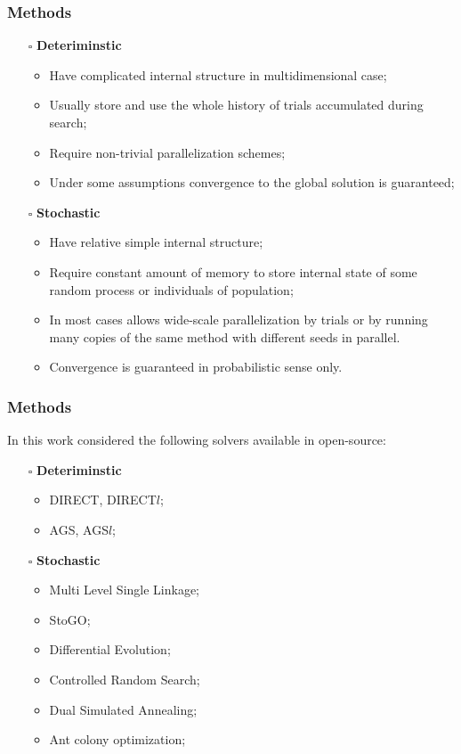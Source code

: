 \documentclass[aspectratio=1610]{beamer}
\begin{document}
\begin{frame}
  \frametitle{Methods}
  \begin{itemize}
    \item[$\square$] \textbf{Deteriminstic}
    \begin{itemize}
      \item Have complicated internal structure in multidimensional case;
      \item Usually store and use the whole history of trials accumulated during search;
      \item Require non-trivial parallelization schemes;
      \item Under some assumptions convergence to the global solution is guaranteed;
    \end{itemize}
    \item[$\square$] \textbf{Stochastic}
    \begin{itemize}
      \item Have relative simple internal structure;
      \item Require constant amount of memory to store internal state of some random process or individuals of population;
      \item In most cases allows wide-scale parallelization by trials or by running many copies of the same method
      with different seeds in parallel.
      \item Convergence is guaranteed in probabilistic sense only.
    \end{itemize}
  \end{itemize}
\end{frame}

\begin{frame}
  \frametitle{Methods}
  In this work considered the following solvers available in open-source:
  \begin{itemize}
    \item[$\square$] \textbf{Deteriminstic}
    \begin{itemize}
      \item DIRECT, DIRECT$l$;
      \item AGS, AGS$l$;
    \end{itemize}
    \item[$\square$] \textbf{Stochastic}
    \begin{itemize}
      \item Multi Level Single Linkage;
      \item StoGO;
      \item Differential Evolution;
      \item Controlled Random Search;
      \item Dual Simulated Annealing;
      \item Ant colony optimization;
    \end{itemize}
  \end{itemize}
\end{frame}
\end{document}
